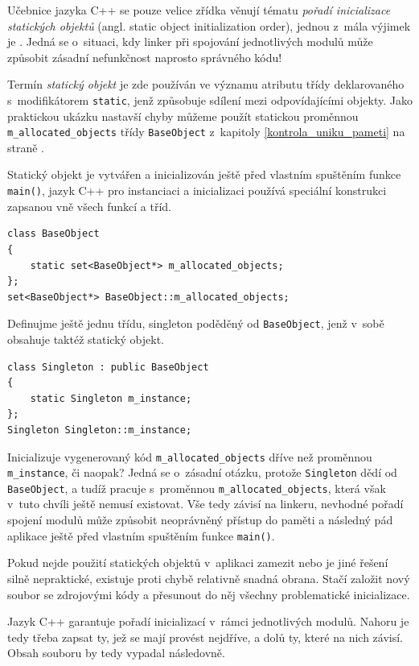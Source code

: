 \documentclass[11pt,twoside,a4paper]{book}
\begin{document}
Učebnice jazyka C++ se pouze velice zřídka věnují tématu \textit{pořadí inicializace statických objektů} (angl. static object initialization order), jednou z~mála výjimek je \cite{industrial_strength_cpp}. Jedná se o~situaci, kdy linker při spojování jednotlivých modulů může způsobit zásadní nefunkčnost naprosto správného kódu!

Termín \textit{statický objekt} je zde používán ve významu atributu třídy deklarovaného s~modifikátorem \texttt{static}, jenž způsobuje sdílení mezi odpovídajícími objekty. Jako praktickou ukázku nastavší chyby můžeme použít statickou proměnnou \texttt{m\_allocated\_objects} třídy \texttt{BaseObject} z~kapitoly \ref{kontrola_uniku_pameti} na straně \pageref{kontrola_uniku_pameti}.

Statický objekt je vytvářen a inicializován ještě před vlastním spuštěním funkce \texttt{main()}, jazyk C++ pro instanciaci a inicializaci používá speciální konstrukci zapsanou vně všech funkcí a tříd.

\begin{verbatim}
class BaseObject
{
    static set<BaseObject*> m_allocated_objects;
};
set<BaseObject*> BaseObject::m_allocated_objects;
\end{verbatim}

Definujme ještě jednu třídu, singleton poděděný od \texttt{BaseObject}, jenž v~sobě obsahuje taktéž statický objekt.

\begin{verbatim}
class Singleton : public BaseObject
{
    static Singleton m_instance;
};
Singleton Singleton::m_instance;
\end{verbatim}

Inicializuje vygenerovaný kód \texttt{m\_allocated\_objects} dříve než proměnnou \texttt{m\_in\-stan\-ce}, či naopak? Jedná se o~zásadní otázku, protože \texttt{Singleton} dědí od \texttt{BaseObject}, a tudíž pracuje s~proměnnou \texttt{m\_allocated\_objects}, která však v~tuto chvíli ještě nemusí existovat. Vše tedy závisí na linkeru, nevhodné pořadí spojení modulů může způsobit neoprávněný přístup do paměti a následný pád aplikace ještě před vlastním spuštěním funkce \texttt{main()}.

Pokud nejde použití statických objektů v~aplikaci zamezit nebo je jiné řešení silně nepraktické, existuje proti chybě relativně snadná obrana. Stačí založit nový soubor se zdrojovými kódy a přesunout do něj všechny problematické inicializace.

Jazyk C++ garantuje pořadí inicializací v~rámci jednotlivých modulů. Nahoru je tedy třeba zapsat ty, jež se mají provést nejdříve, a dolů ty, které na nich závisí. Obsah souboru by tedy vypadal následovně.
\end{document}
